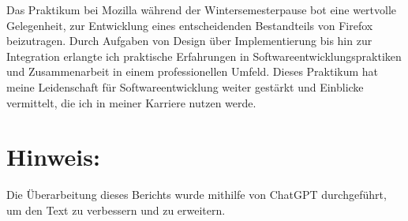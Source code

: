 \documentclass{article}
\begin{document}
Das Praktikum bei Mozilla während der Wintersemesterpause bot eine wertvolle
Gelegenheit, zur Entwicklung eines entscheidenden Bestandteils von Firefox
beizutragen. Durch Aufgaben von Design über Implementierung bis hin zur
Integration erlangte ich praktische Erfahrungen in
Softwareentwicklungspraktiken und Zusammenarbeit in einem professionellen
Umfeld. Dieses Praktikum hat meine Leidenschaft für Softwareentwicklung weiter
gestärkt und Einblicke vermittelt, die ich in meiner Karriere nutzen werde.

\section*{Hinweis:}

Die Überarbeitung dieses Berichts wurde mithilfe von ChatGPT durchgeführt, um
den Text zu verbessern und zu erweitern.
\end{document}
